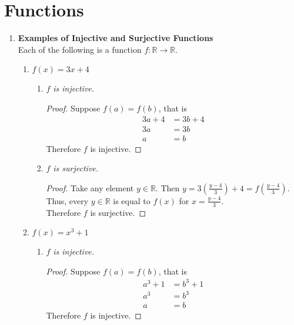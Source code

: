 \setcounter{chapter}{5}
\chapter{Functions}
\label{ch:functions}

\begin{enumerate}[label={\Alph*.},font={\bfseries}]
\item {\bf Examples of Injective and Surjective Functions} \\
  Each of the following is a function $f : \mathbb{R} \to \mathbb{R}$.
  \begin{enumerate}[label={\arabic*},font={\bfseries}]
  \item $f(x) = 3x + 4$
    \begin{enumerate}[label={\alph*},font={\bfseries}]
    \item {\sl $f$ is injective.}
      \begin{proof}
        Suppose $f(a) = f(b)$, that is
        \begin{align*}
          3a + 4 &= 3b + 4 \\
          3a &= 3b \\
          a &= b
        \end{align*}
        Therefore $f$ is injective.
      \end{proof}
    \item {\sl $f$ is surjective.}
      \begin{proof}
        Take any element $y \in \mathbb{R}$. Then $y = 3(\frac{y-4}{3}) + 4 = f(\frac{y-4}{3})$. \\
        Thus, every $y \in \mathbb{R}$ is equal to $f(x)$ for $x = \frac{y-4}{3}$. \\
        Therefore $f$ is surjective.
      \end{proof}
    \end{enumerate}
  \item $f(x) = x^3 + 1$
    \begin{enumerate}[label={\alph*},font={\bfseries}]
    \item {\sl $f$ is injective.}
      \begin{proof}
        Suppose $f(a) = f(b)$, that is
        \begin{align*}
          a^3 + 1 &= b^3 + 1 \\
          a^3 &= b^3 \\
          a &= b
        \end{align*}
        Therefore $f$ is injective.

\end{proof}
\end{enumerate}
\end{enumerate}
\end{enumerate}
